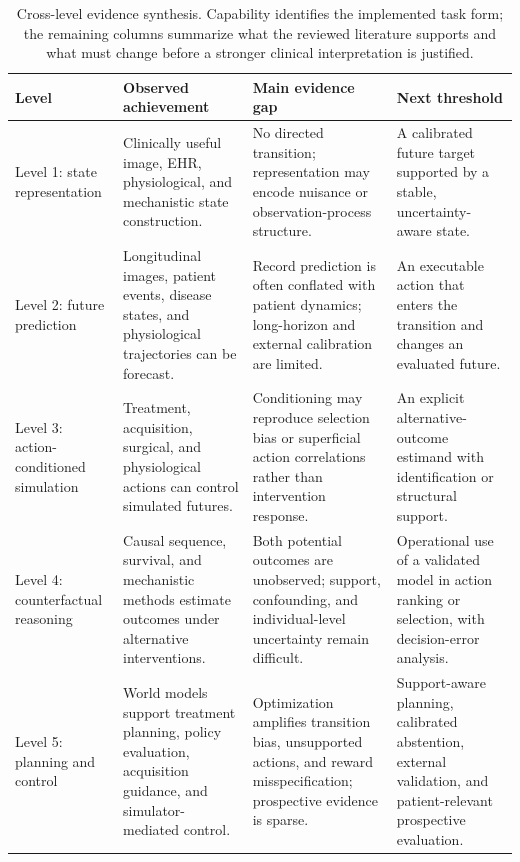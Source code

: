 \begin{table}[t]
\caption{Cross-level evidence synthesis. Capability identifies the implemented task form; the remaining columns summarize what the reviewed literature supports and what must change before a stronger clinical interpretation is justified.}
\label{tab:cross-level-synthesis}
\centering
\small
\setlength{\tabcolsep}{4pt}
\renewcommand{\arraystretch}{1.08}
\begin{tabularx}{\textwidth}{@{}p{2.6cm}p{4.0cm}p{4.0cm}X@{}}
\toprule
\textbf{Level} & \textbf{Observed achievement} & \textbf{Main evidence gap} & \textbf{Next threshold} \\
\midrule
Level 1: state representation & Clinically useful image, EHR, physiological, and mechanistic state construction. & No directed transition; representation may encode nuisance or observation-process structure. & A calibrated future target supported by a stable, uncertainty-aware state. \\
Level 2: future prediction & Longitudinal images, patient events, disease states, and physiological trajectories can be forecast. & Record prediction is often conflated with patient dynamics; long-horizon and external calibration are limited. & An executable action that enters the transition and changes an evaluated future. \\
Level 3: action-conditioned simulation & Treatment, acquisition, surgical, and physiological actions can control simulated futures. & Conditioning may reproduce selection bias or superficial action correlations rather than intervention response. & An explicit alternative-outcome estimand with identification or structural support. \\
Level 4: counterfactual reasoning & Causal sequence, survival, and mechanistic methods estimate outcomes under alternative interventions. & Both potential outcomes are unobserved; support, confounding, and individual-level uncertainty remain difficult. & Operational use of a validated model in action ranking or selection, with decision-error analysis. \\
Level 5: planning and control & World models support treatment planning, policy evaluation, acquisition guidance, and simulator-mediated control. & Optimization amplifies transition bias, unsupported actions, and reward misspecification; prospective evidence is sparse. & Support-aware planning, calibrated abstention, external validation, and patient-relevant prospective evaluation. \\
\bottomrule
\end{tabularx}
\end{table}

